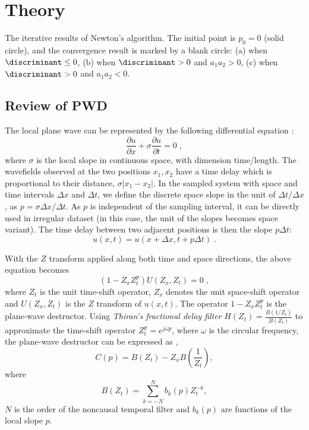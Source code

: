 \section{Theory}


{
The iterative results of Newton's algorithm.
The initial point is $p_0=0$ (solid circle), 
and the convergence result is marked by a blank circle:
(a) when $\discriminant\leq 0$,
(b) when $\discriminant>0$ and $a_1a_2>0$,
(c) when $\discriminant>0$ and $a_1a_2<0$.
}


\subsection{Review of PWD}
The local plane wave can be represented by the following differential equation
\cite[]{claerbout1992earth}:
\begin{equation}
\frac{\partial u}{\partial x}+\sigma\frac{\partial u}{\partial t} =0\;,
\end{equation}
where $\sigma$ is the local slope in continuous space, 
with dimension time/length.
The wavefields observed at the two positions $x_1,x_2$ have a time delay
which is proportional to their distance, $\sigma|x_1-x_2|$.
In the sampled system with space and time intervals $\Delta x$ and $\Delta t$,
we define the discrete space slope in the unit of $\Delta t/\Delta x$,
as $p=\sigma\Delta x/\Delta t$.
As $p$ is independent of the sampling interval, 
it can be directly used in irregular dataset
(in this case, the unit of the slopes becomes space variant).
The time delay between two adjacent positions is then the slope $p\Delta t$:
\begin{equation}
u(x,t)=u(x+\Delta x, t+p\Delta t)\;.
\end{equation}

With the $Z$ transform applied along both time and space directions, 
the above equation becomes
\begin{equation}\label{eq:pwd0}
(1-Z_xZ_t^p)U(Z_x,Z_t)=0\;,
\end{equation}
where $Z_t$ is the unit time-shift operator,
$Z_x$ denotes the unit space-shift operator
and $U(Z_x,Z_t)$ is the $Z$ transform of $u(x,t)$.
The operator $1-Z_xZ_t^p$ is the plane-wave destructor.
Using \textit{Thiran's fractional delay filter} 
$H(Z_t)=\displaystyle{\frac{B(1/Z_t)}{B(Z_t)}}$
\cite[]{thiran1971recursive}
to approximate the time-shift operator $Z_t^p=e^{j\omega p}$,
where $\omega$ is the circular frequency,
the plane-wave destructor can be expressed as 
\cite[]{fomel:1946},
\begin{equation}\label{eq:pwd}
C(p)=B(Z_t)-Z_xB(\frac{1}{Z_t}),
\end{equation}
where
\begin{equation}
B(Z_t)=\sum_{k=-N}^N b_k(p) Z_t^{-k},
\end{equation}
$N$ is the order of the noncausal temporal filter
and $b_k(p)$ are functions of the local slope $p$.

